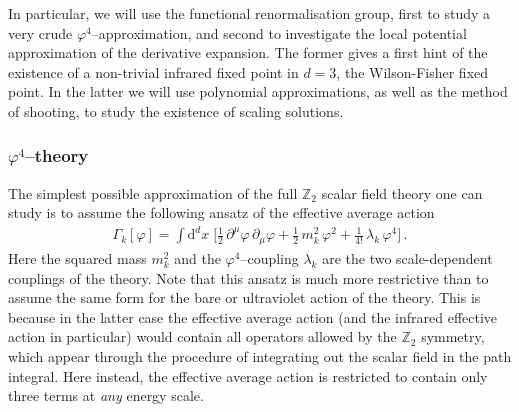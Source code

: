 \documentclass[11pt]{book}
\numberwithin{equation}{chapter}
\begin{document}
In particular, we will
use the functional renormalisation group, first to
study a very crude $\varphi^4$--approximation, and
second to investigate the local potential approximation
of the derivative expansion. The former gives a first
hint of the existence of a non-trivial infrared fixed point
in $d=3$, the Wilson-Fisher fixed point. In the latter
we will use polynomial approximations, as well
as the method of shooting, to study the existence of
scaling solutions.

\subsubsection{$\varphi^4$--theory}

The simplest possible approximation of the full $\mathbb Z_2$
scalar field theory one can study is to assume the following
ansatz of the effective average action
\begin{align}
  \Gamma_k [\varphi] = \int \mathrm d^dx \;
  \bigg[
  \frac 12 \, \partial^\mu \varphi \, \partial_\mu \varphi
  + \frac 12 \, m_k^2 \, \varphi^2
  + \frac {1}{4!} \, \lambda_k \, \varphi^4
  \bigg] \,.
\end{align}
Here the squared mass $m_k^2$ and the $\varphi^4$--coupling
$\lambda_k$ are the two scale-dependent couplings of the
theory.
Note that this ansatz is much more restrictive than to assume
the same form for the bare or ultraviolet action of the theory.
This is because in the latter case the effective average action
(and the infrared effective action in particular) would contain
all operators allowed by the $\mathbb Z_2$ symmetry,
which appear through the procedure
of integrating out the scalar field in the path integral. Here instead,
the effective average action is restricted to contain only three
terms at \textit{any} energy scale.
\end{document}
